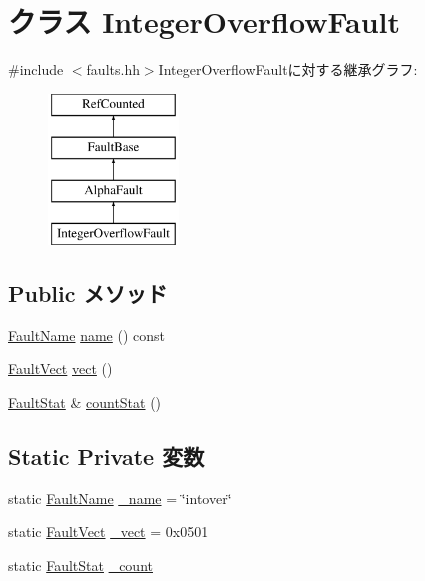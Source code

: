 \hypertarget{classAlphaISA_1_1IntegerOverflowFault}{
\section{クラス IntegerOverflowFault}
\label{classAlphaISA_1_1IntegerOverflowFault}
}


{\ttfamily \#include $<$faults.hh$>$}IntegerOverflowFaultに対する継承グラフ:\begin{figure}[H]
\begin{center}
\leavevmode
\includegraphics[height=4cm]{classAlphaISA_1_1IntegerOverflowFault}
\end{center}
\end{figure}
\subsection*{Public メソッド}
\begin{DoxyCompactItemize}
\item 
\hyperlink{sim_2faults_8hh_abb196df64725e5c2568c900cf130d8d7}{FaultName} \hyperlink{classAlphaISA_1_1IntegerOverflowFault_a73adb23259baf912a81683a9790a303f}{name} () const 
\item 
\hyperlink{classm5_1_1params_1_1Addr}{FaultVect} \hyperlink{classAlphaISA_1_1IntegerOverflowFault_ae15c5d7ab0162821b93d668d0b225198}{vect} ()
\item 
\hyperlink{classStats_1_1Scalar}{FaultStat} \& \hyperlink{classAlphaISA_1_1IntegerOverflowFault_a6c79663c761ff57265459f7e3aefaf4c}{countStat} ()
\end{DoxyCompactItemize}
\subsection*{Static Private 変数}
\begin{DoxyCompactItemize}
\item 
static \hyperlink{sim_2faults_8hh_abb196df64725e5c2568c900cf130d8d7}{FaultName} \hyperlink{classAlphaISA_1_1IntegerOverflowFault_ac79073ffcd2c66a09bcd3bd3ad206019}{\_\-name} = \char`\"{}intover\char`\"{}
\item 
static \hyperlink{classm5_1_1params_1_1Addr}{FaultVect} \hyperlink{classAlphaISA_1_1IntegerOverflowFault_ad9e5855b9db0b2824cf6c507be4a872e}{\_\-vect} = 0x0501
\item 
static \hyperlink{classStats_1_1Scalar}{FaultStat} \hyperlink{classAlphaISA_1_1IntegerOverflowFault_a4bff925c412f331c5aaf6a39b79619ff}{\_\-count}
\end{DoxyCompactItemize}


